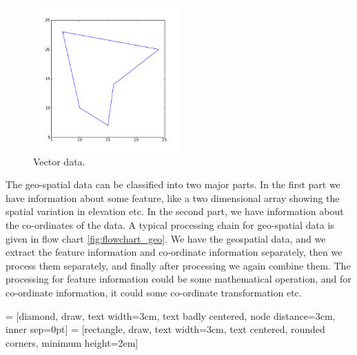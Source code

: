\documentclass[10pt]{book}
\begin{document}
{\beforefig
\begin{figure}[h!]
  \centering
    \includegraphics[width=0.5\textwidth]{images/vect.png}
  \caption{Vector data.}
   \label{fig:vect}
\end{figure}
\afterfig

The geo-spatial data can be classified into two major parts. In the first part we have information about some feature, like a two dimensional array showing the spatial variation in elevation etc. In the second part, we have information about the co-ordinates of the data. A typical processing chain for geo-spatial data is given in flow chart \ref{fig:flowchart_geo}. We have the geospatial data, and we extract the feature information and co-ordinate information separately, then we process them separately, and finally after processing we again combine them. The processing for feature information could be some mathematical operation, and for co-ordinate information, it could some co-ordinate transformation etc.

 = [diamond, draw, text width=3cm, text badly centered, node distance=3cm, inner sep=0pt]
 = [rectangle, draw, text width=3cm, text centered, rounded corners, minimum height=2em]
\begin{figure}[h]
 \begin{center}
\end{center}
\end{figure}}
\end{document}

